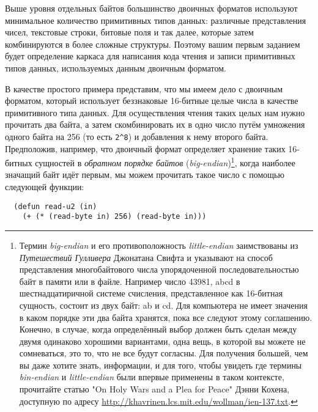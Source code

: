 Выше уровня отдельных байтов большинство двоичных форматов используют минимальное
количество примитивных типов данных: различные представления чисел, текстовые строки,
битовые поля и так далее, которые затем комбинируются в более сложные структуры. Поэтому
вашим первым заданием будет определение каркаса для написания кода чтения и записи
примитивных типов данных, используемых данным двоичным форматом.

В качестве простого примера представим, что мы имеем дело с двоичным форматом, который
использует беззнаковые 16-битные целые числа в качестве примитивного типа данных. Для
осуществления чтения таких целых нам нужно прочитать два байта, а затем скомбинировать их
в одно число путём умножения одного байта на 256 (то есть \lstinline!2^8!) и добавления к
нему второго байта. Предположив, например, что двоичный формат определяет хранение таких
16-битных сущностей в \textit{обратном порядке байтов}
(\textit{big-endian})\footnote{Термин \textit{big-endian} и его противоположность
  \textit{little-endian} заимствованы из \textit{Путешествий Гулливера} Джонатана Свифта и
  указывают на способ представления многобайтового числа упорядоченной последовательностью
  байт в памяти или в файле. Например число 43981, abcd в шестнадцатиричной системе
  счисления, представленное как 16-битная сущность, состоит из двух байт: ab и cd. Для
  компьютера не имеет значения в каком порядке эти два байта хранятся, пока все следуют
  этому соглашению. Конечно, в случае, когда определённый выбор должен быть сделан между
  двумя одинаково хорошими вариантами, одна вещь, в которой вы можете не сомневаться, это
  то, что не все будут согласны. Для получения большей, чем вы даже хотите знать,
  информации, и для того, чтобы увидеть где термины \textit{bin-endian} и
  \textit{little-endian} были впервые применены в таком контексте, прочитайте статью "On
  Holy Wars and a Plea for Peace" Дэнни Кохена, доступную по адресу
  \url{http://khavrinen.lcs.mit.edu/wollman/ien-137.txt}.}, когда наиболее значащий байт идёт
первым, мы можем прочитать такое число с помощью следующей функции:

\begin{lstlisting}
  (defun read-u2 (in)
    (+ (* (read-byte in) 256) (read-byte in)))
\end{lstlisting}

